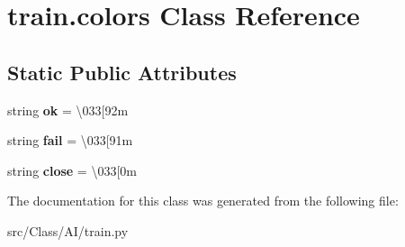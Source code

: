 \hypertarget{classtrain_1_1colors}{}\section{train.\+colors Class Reference}
\label{classtrain_1_1colors}
\subsection*{Static Public Attributes}
\begin{DoxyCompactItemize}
\item 
\mbox{\label{classtrain_1_1colors_ad7ca9653ae40be4a1de4f78f6de14a98}} 
string {\bfseries ok} = \textquotesingle{}\textbackslash{}033\mbox{[}92m\textquotesingle{}
\item 
\mbox{\label{classtrain_1_1colors_aaefac86b98e9cbbb2aee11a49fd9bbd1}} 
string {\bfseries fail} = \textquotesingle{}\textbackslash{}033\mbox{[}91m\textquotesingle{}
\item 
\mbox{\label{classtrain_1_1colors_a3e61d93e54eb3a4740191ab3206c403a}} 
string {\bfseries close} = \textquotesingle{}\textbackslash{}033\mbox{[}0m\textquotesingle{}
\end{DoxyCompactItemize}


The documentation for this class was generated from the following file\+:\begin{DoxyCompactItemize}
\item 
src/\+Class/\+A\+I/train.\+py\end{DoxyCompactItemize}

